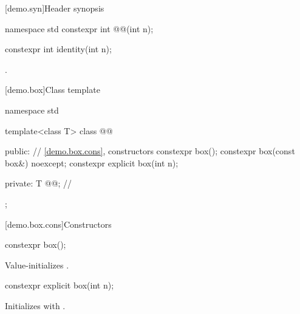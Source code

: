 [demo.syn]{Header  synopsis}

\begin{codeblock}
namespace std {
  constexpr int @@(int n);
}
\end{codeblock}

%
\begin{itemdecl}
constexpr int identity(int n);
\end{itemdecl}

\begin{itemdescr}
\pnum
\returns
{}.
\end{itemdescr}

[demo.box]{Class template }

\begin{codeblock}
namespace std {
  template<class T>
  class @@ {
  public:
    // \ref{demo.box.cons}, constructors
    constexpr box();
    constexpr box(const box&) noexcept;
    constexpr explicit box(int n);

  private:
    T @@; // \expos
  };
}
\end{codeblock}

[demo.box.cons]{Constructors}

%
\begin{itemdecl}
constexpr box();
\end{itemdecl}

\begin{itemdescr}
\pnum
\effects
Value-initializes .
\end{itemdescr}

%
\begin{itemdecl}
constexpr explicit box(int n);
\end{itemdecl}

\begin{itemdescr}
\pnum
\effects
Initializes  with .
\end{itemdescr}

